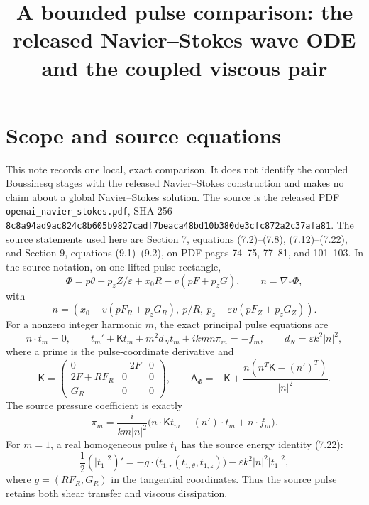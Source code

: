 \documentclass[11pt]{article}
\title{A bounded pulse comparison: the released Navier--Stokes wave ODE and the coupled viscous pair}
\author{}
\date{}
\begin{document}
\maketitle
\sloppy

\section{Scope and source equations}
This note records one local, exact comparison.  It does not identify the
coupled Boussinesq stages with the released Navier--Stokes construction and
makes no claim about a global Navier--Stokes solution.  The source is the
released PDF \texttt{openai\_navier\_stokes.pdf}, SHA-256
\texttt{8c8a94ad9ac824c8b605b9827cadf7beaca48bd10b380de3cfc872a2c37afa81}.
The source statements used here are Section 7, equations (7.2)--(7.8),
(7.12)--(7.22), and Section 9, equations (9.1)--(9.2), on PDF pages 74--75,
77--81, and 101--103. In the source notation, on one lifted pulse rectangle,
\begin{equation}
 \Phi=p\theta+p_zZ/\varepsilon+x_0R-v(pF+p_zG),\qquad
 n=\nabla_*\Phi,
\end{equation}
with
\begin{equation}
 n=(x_0-v(pF_R+p_zG_R),\ p/R,\ p_z-\varepsilon v(pF_Z+p_zG_Z)).
 \label{eq:nsource}
\end{equation}
For a nonzero integer harmonic $m$, the exact principal pulse equations are
\begin{equation}
 n\cdot t_m=0,\qquad
 t_m'+\mathsf Kt_m+m^2d_Nt_m+ikm n\pi_m=-f_m,
 \qquad d_N=\varepsilon k^2|n|^2,
 \label{eq:sourcepulse}
\end{equation}
where a prime is the pulse-coordinate derivative and
\begin{equation}
 \mathsf K=\begin{pmatrix}0&-2F&0\\2F+RF_R&0&0\\G_R&0&0\end{pmatrix},\qquad
 \mathsf A_\Phi=-\mathsf K+\frac{n(n^T\mathsf K-(n')^T)}{|n|^2}.
 \label{eq:sourceoperator}
\end{equation}
The source pressure coefficient is exactly
\begin{equation}
 \pi_m=\frac{i}{km|n|^2}\bigl(n\cdot\mathsf Kt_m-(n')\cdot t_m+n\cdot f_m\bigr).
 \label{eq:sourcepressure}
\end{equation}
For $m=1$, a real homogeneous pulse $t_1$ has the source energy identity
(7.22):
\begin{equation}
 \frac12(|t_1|^2)'=-g\cdot\bigl(t_{1,r}(t_{1,\theta},t_{1,z})\bigr)
 -\varepsilon k^2|n|^2|t_1|^2,
 \label{eq:sourceenergy}
\end{equation}
where $g=(RF_R,G_R)$ in the tangential coordinates.  Thus the source pulse
retains both shear transfer and viscous dissipation.
\end{document}
